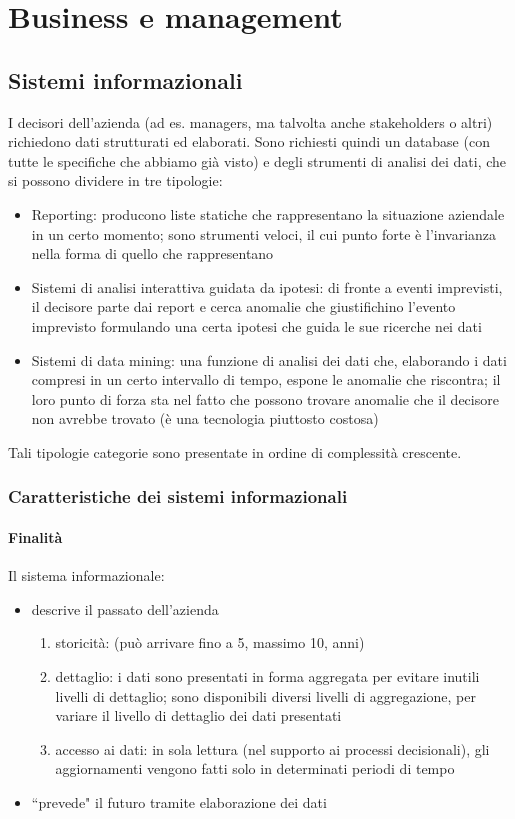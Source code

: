 \chapter{Business e management}
\label{chap:Business e management}

\section{Sistemi informazionali}
\label{sec:Sistemi informazionali}
I decisori dell'azienda (ad es. managers, ma talvolta anche stakeholders o altri) richiedono dati strutturati ed elaborati.
Sono richiesti quindi un database (con tutte le specifiche che abbiamo gi\`a visto) e degli strumenti di analisi dei dati, che si possono dividere in tre tipologie:
\begin{itemize}
  \item Reporting: producono liste statiche che rappresentano la situazione aziendale in un certo momento; sono strumenti veloci, il cui punto forte \`e l'invarianza nella forma di quello che rappresentano
  \item Sistemi di analisi interattiva guidata da ipotesi: di fronte a eventi imprevisti, il decisore parte dai report
  e cerca anomalie che giustifichino l'evento imprevisto formulando una certa ipotesi che guida
  le sue ricerche nei dati
  \item Sistemi di data mining: una funzione di analisi dei dati che, elaborando i dati compresi in un certo intervallo
  di tempo, espone le anomalie che riscontra; il loro punto di forza sta nel fatto che possono trovare anomalie che
  il decisore non avrebbe trovato (\`e una tecnologia piuttosto costosa)
\end{itemize}
Tali tipologie categorie sono presentate in ordine di complessit\`a crescente.

\subsection{Caratteristiche dei sistemi informazionali}
\label{sub:Caratteristiche dei sistemi informazionali}
\subsubsection{Finalit\`a}
Il sistema informazionale:
\begin{itemize}
  \item descrive il passato dell'azienda
  \begin{enumerate}
    \item storicit\`a: (pu\`o arrivare fino a 5, massimo 10, anni)
    \item dettaglio: i dati sono presentati in forma aggregata per evitare inutili
    livelli di dettaglio; sono disponibili diversi livelli di aggregazione, per variare
    il livello di dettaglio dei dati presentati
    \item accesso ai dati: in sola lettura (nel supporto ai processi decisionali),
    gli aggiornamenti vengono fatti solo in determinati periodi di tempo
  \end{enumerate}
  \item ``prevede" il futuro tramite elaborazione dei dati
\end{itemize}
